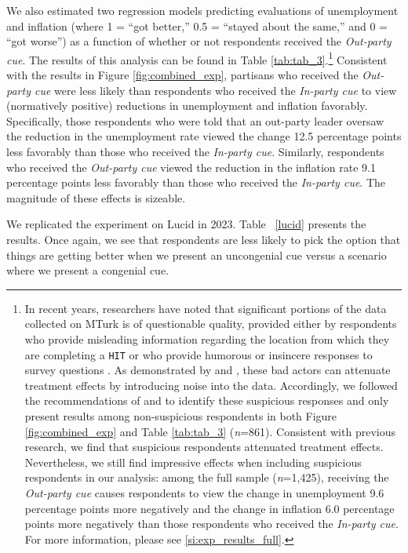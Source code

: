 \documentclass[12pt, letterpaper]{article}
\begin{document}
We also estimated two regression models predicting evaluations of unemployment and inflation (where 1 = ``got better,'' 0.5 = ``stayed about the same,'' and 0 = ``got worse'') as a function of whether or not respondents received the \textit{Out-party cue}. The results of this analysis can be found in Table \ref{tab:tab_3}.\footnote{In recent years, researchers have noted that significant portions of the data collected on MTurk is of questionable quality, provided either by respondents who provide misleading information regarding the location from which they are completing a \texttt{HIT} or who provide humorous or insincere responses to survey questions \citep[e.g.,][]{turk_paper,mturk_2019,bai_2018,dreyfuss_2018,kennedy2019shape,ryan_2018}. As demonstrated by  \citet{turk_paper} and \citet{kennedy2019shape}, these bad actors can attenuate treatment effects by introducing noise into the data. Accordingly, we followed the recommendations of \citet{turk_paper} and \citet{kennedy2019shape} to identify these suspicious responses and only present results among non-suspicious respondents in both Figure \ref{fig:combined_exp} and Table \ref{tab:tab_3} (\textit{n}=861). Consistent with previous research, we find that suspicious respondents attenuated treatment effects. Nevertheless, we still find impressive effects when including suspicious respondents in our analysis: among the full sample (\textit{n}=1,425), receiving the \textit{Out-party cue} causes respondents to view the change in unemployment 9.6 percentage points more negatively and the change in inflation 6.0 percentage points more negatively than those respondents who received the \textit{In-party cue}. For more information, please see \ref{si:exp_results_full}.} Consistent with the results in Figure \ref{fig:combined_exp}, partisans who received the \textit{Out-party cue} were less likely than respondents who received the \textit{In-party cue} to view (normatively positive) reductions in unemployment and inflation favorably. Specifically, those respondents who were told that an out-party leader oversaw the reduction in the unemployment rate viewed the change 12.5 percentage points less favorably than those who received the \textit{In-party cue}. Similarly, respondents who received the \textit{Out-party cue} viewed the reduction in the inflation rate 9.1 percentage points less favorably than those who received the \textit{In-party cue}. The magnitude of these effects is sizeable.



We replicated the experiment on Lucid in 2023. Table ~\ref{lucid} presents the results. Once again, we see that respondents are less likely to pick the option that things are getting better when we present an uncongenial cue versus a scenario where we present a congenial cue. 
\end{document}
